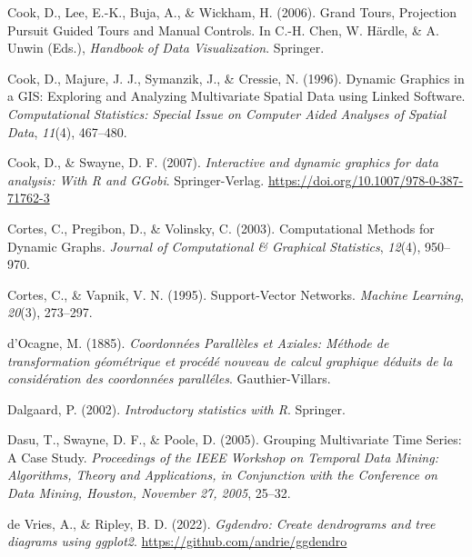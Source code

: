 \documentclass[
  letterpaper,
]{krantz}
\newlength{\cslhangindent}
\newlength{\cslentryspacingunit} %
\newenvironment{CSLReferences}[2] %
 {%
  \setlength{\parindent}{0pt}
  \ifodd #1
  \let\oldpar\par
  \def\par{\hangindent=\cslhangindent\oldpar}
  \fi
  \setlength{\parskip}{#2\cslentryspacingunit}
 }%
 {}
\begin{document}
\begin{CSLReferences}{1}{0}
\leavevmode{}%
Cook, D., Lee, E.-K., Buja, A., \& Wickham, H. (2006). {G}rand {T}ours,
{P}rojection {P}ursuit {G}uided {T}ours and {M}anual {C}ontrols. In
C.-H. Chen, W. Härdle, \& A. Unwin (Eds.), \emph{Handbook of {D}ata
{V}isualization}. Springer.

\leavevmode{}%
Cook, D., Majure, J. J., Symanzik, J., \& Cressie, N. (1996). {D}ynamic
{G}raphics in a {GIS}: {E}xploring and {A}nalyzing {M}ultivariate
{S}patial {D}ata using {L}inked {S}oftware. \emph{Computational
Statistics: Special Issue on Computer Aided Analyses of Spatial Data},
\emph{11}(4), 467--480.

\leavevmode{}%
Cook, D., \& Swayne, D. F. (2007). \emph{Interactive and dynamic
graphics for data analysis: With {R} and {GGobi}}. Springer-Verlag.
\url{https://doi.org/10.1007/978-0-387-71762-3}

\leavevmode{}%
Cortes, C., Pregibon, D., \& Volinsky, C. (2003). Computational
{M}ethods for {D}ynamic {G}raphs. \emph{Journal of Computational \&
Graphical Statistics}, \emph{12}(4), 950--970.

\leavevmode{}%
Cortes, C., \& Vapnik, V. N. (1995). Support-{V}ector {N}etworks.
\emph{Machine Learning}, \emph{20}(3), 273--297.

\leavevmode{}%
d'Ocagne, M. (1885). \emph{{C}oordonnées {P}arallèles et {A}xiales:
{M}éthode de transformation géométrique et procédé nouveau de calcul
graphique déduits de la considération des coordonnées paralléles}.
Gauthier-Villars.

\leavevmode{}%
Dalgaard, P. (2002). \emph{Introductory statistics with {R}}. Springer.

\leavevmode{}%
Dasu, T., Swayne, D. F., \& Poole, D. (2005). Grouping {M}ultivariate
{T}ime {S}eries: A {C}ase {S}tudy. \emph{Proceedings of the IEEE
Workshop on {T}emporal {D}ata {M}ining: {A}lgorithms, {T}heory and
{A}pplications, in Conjunction with the Conference on Data Mining,
Houston, November 27, 2005}, 25--32.

\leavevmode{}%
de Vries, A., \& Ripley, B. D. (2022). \emph{Ggdendro: Create
dendrograms and tree diagrams using ggplot2}.
\url{https://github.com/andrie/ggdendro}


\end{CSLReferences}
\end{document}
